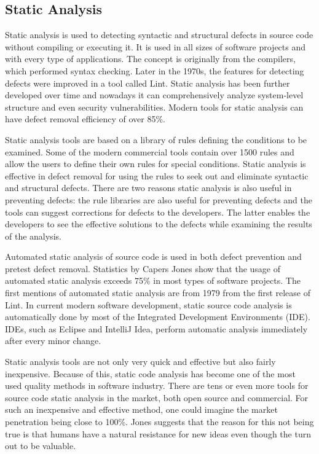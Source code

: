 
\subsection{Static Analysis} 
Static analysis is used to detecting syntactic and structural defects in source code without compiling or executing it. It is used in all sizes of software projects and with every type of applications. The concept is originally from the compilers, which performed syntax checking. Later in the 1970s, the features for detecting defects were improved in a tool called Lint. Static analysis has been further developed over time and nowadays it can comprehensively analyze system-level structure and even security vulnerabilities. Modern tools for static analysis can have defect removal efficiency of over 85\%.

Static analysis tools are based on a library of rules defining the conditions to be examined. Some of the modern commercial tools contain over 1500 rules and allow the users to define their own rules for special conditions. Static analysis is effective in defect removal for using the rules to seek out and eliminate syntactic and structural defects. There are two reasons static analysis is also useful in preventing defects: the rule libraries are also useful for preventing defects and the tools can suggest corrections for defects to the developers. The latter enables the developers to see the effective solutions to the defects while examining the results of the analysis.

Automated static analysis of source code is used in both defect prevention and pretest defect removal. Statistics by Capers Jones show that the usage of automated static analysis exceeds 75\% in most types of software projects. The first mentions of automated static analysis are from 1979 from the first release of Lint. In current modern software development, static source code analysis is automatically done by most of the Integrated Development Environments (IDE). IDEs, such as Eclipse and IntelliJ Idea, perform automatic analysis immediately after every minor change.

Static analysis tools are not only very quick and effective but also fairly inexpensive. Because of this, static code analysis has become one of the most used quality methods in software industry. There are tens or even more tools for source code static analysis in the market, both open source and commercial. For such an inexpensive and effective method, one could imagine the market penetration being close to 100\%. Jones suggests that the reason for this not being true is that humans have a natural resistance for new ideas even though the turn out to be valuable.




